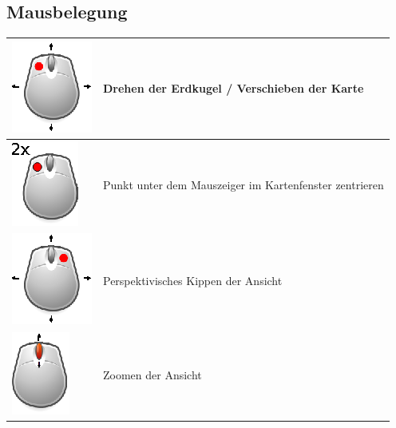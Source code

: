 \documentclass[10pt]{scrreprt}
\begin{document}
\subsection*{Mausbelegung}
\begin{tabular}{|>{\centering \arraybackslash}m{3cm}|m{9cm}|}
\hline
\includegraphics[scale=1.0]{KeyImages/mouseDrag_left.eps} & Drehen der Erdkugel / Verschieben der Karte \\ 
\hline 
\includegraphics[scale=1.0]{KeyImages/mouseDoubleClick_left.eps} & Punkt unter dem Mauszeiger im Kartenfenster zentrieren \\
\hline
\includegraphics[scale=1.0]{KeyImages/mouseDrag_right.eps} & Perspektivisches Kippen der Ansicht \\
\hline
\includegraphics[scale=1.0]{KeyImages/mouse_scrollen.eps} & Zoomen der Ansicht \\
\hline
\end{tabular} 



\vspace{5mm}
\end{document}
